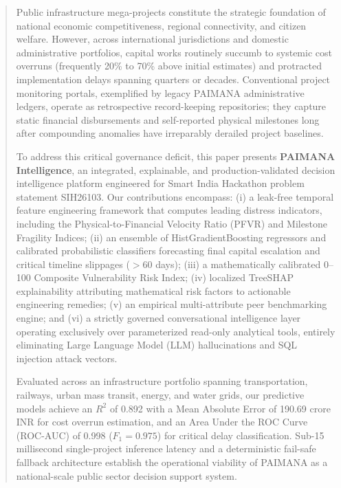 \documentclass[conference]{IEEEtran}
\begin{document}
\begin{abstract}
Public infrastructure mega-projects constitute the strategic foundation of national economic competitiveness, regional connectivity, and citizen welfare. However, across international jurisdictions and domestic administrative portfolios, capital works routinely succumb to systemic cost overruns (frequently 20\% to 70\% above initial estimates) and protracted implementation delays spanning quarters or decades. Conventional project monitoring portals, exemplified by legacy PAIMANA administrative ledgers, operate as retrospective record-keeping repositories; they capture static financial disbursements and self-reported physical milestones long after compounding anomalies have irreparably derailed project baselines. 

To address this critical governance deficit, this paper presents \textbf{PAIMANA Intelligence}, an integrated, explainable, and production-validated decision intelligence platform engineered for Smart India Hackathon problem statement SIH26103. Our contributions encompass: (i) a leak-free temporal feature engineering framework that computes leading distress indicators, including the Physical-to-Financial Velocity Ratio (PFVR) and Milestone Fragility Indices; (ii) an ensemble of HistGradientBoosting regressors and calibrated probabilistic classifiers forecasting final capital escalation and critical timeline slippages ($>60$ days); (iii) a mathematically calibrated 0--100 Composite Vulnerability Risk Index; (iv) localized TreeSHAP explainability attributing mathematical risk factors to actionable engineering remedies; (v) an empirical multi-attribute peer benchmarking engine; and (vi) a strictly governed conversational intelligence layer operating exclusively over parameterized read-only analytical tools, entirely eliminating Large Language Model (LLM) hallucinations and SQL injection attack vectors. 

Evaluated across an infrastructure portfolio spanning transportation, railways, urban mass transit, energy, and water grids, our predictive models achieve an $R^2$ of 0.892 with a Mean Absolute Error of 190.69 crore INR for cost overrun estimation, and an Area Under the ROC Curve (ROC-AUC) of 0.998 ($F_1 = 0.975$) for critical delay classification. Sub-15 millisecond single-project inference latency and a deterministic fail-safe fallback architecture establish the operational viability of PAIMANA as a national-scale public sector decision support system.
\end{abstract}
\end{document}
